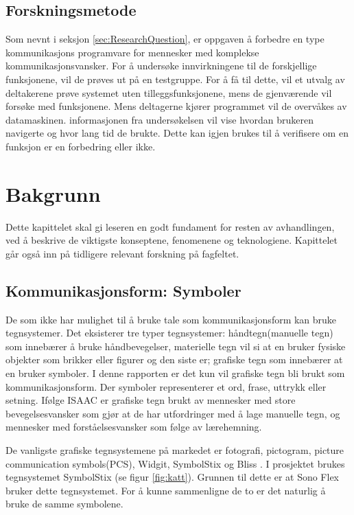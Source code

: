 \documentclass[phd,tocprelim]{cornell}
\begin{document}
\section{Forskningsmetode}

Som nevnt i seksjon \ref{sec:ResearchQuestion}, er oppgaven å forbedre en type kommunikasjons programvare for mennesker med komplekse kommunikasjonsvansker. For å undersøke innvirkningene til de forskjellige funksjonene, vil de prøves ut på en testgruppe.
For å få til dette, vil et utvalg av deltakerene prøve systemet uten tilleggsfunksjonene, mens de gjenværende vil forsøke med funksjonene. Mens deltagerne kjører programmet vil de overvåkes av datamaskinen. informasjonen fra undersøkelsen vil vise hvordan brukeren navigerte og hvor lang tid de brukte. Dette kan igjen brukes til å verifisere om en funksjon er en forbedring eller ikke.


\chapter{Bakgrunn}

Dette kapittelet skal gi leseren en godt fundament for resten av avhandlingen, ved å beskrive de viktigste konseptene, fenomenene og teknologiene. Kapittelet går også inn på tidligere relevant forskning på fagfeltet. 

\section{Kommunikasjonsform: Symboler}

De som ikke har mulighet til å bruke tale som kommunikasjonsform kan bruke tegnsystemer. Det eksisterer tre typer tegnsystemer: håndtegn(manuelle tegn) som innebærer å bruke håndbevegelser, materielle tegn vil si at en bruker fysiske objekter som brikker eller figurer og den siste er; grafiske tegn som innebærer at en bruker symboler. I denne rapporten er det kun vil grafiske tegn bli brukt som kommunikasjonsform. Der symboler representerer et ord, frase, uttrykk eller setning. Ifølge ISAAC \cite{Tegnsystemer} er grafiske tegn brukt av mennesker med store bevegelsesvansker som gjør at de har utfordringer med å lage manuelle tegn, og mennesker med forståelsesvansker som følge av lærehemning.

De vanligste grafiske tegnsystemene på markedet er fotografi, pictogram, picture communication symbols(PCS), Widgit, SymbolStix og Bliss \cite{GrafiskTegn}. I prosjektet brukes tegnsystemet SymbolStix (se figur \ref{fig:katt}). Grunnen til dette er at Sono Flex bruker dette tegnsystemet. For å kunne sammenligne de to er det naturlig å bruke de samme symbolene.
\end{document}
